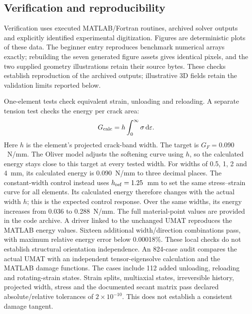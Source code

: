 \documentclass[preprint,11pt,a4paper]{elsarticle}
\begin{document}
\subsection{Verification and reproducibility}

Verification uses executed MATLAB/Fortran
routines, archived solver outputs and explicitly identified experimental
digitization. Figures are deterministic plots of these data. The beginner
entry reproduces benchmark numerical arrays exactly; rebuilding the seven
generated figure assets gives identical pixels, and the two supplied geometry
illustrations retain their source bytes. These checks establish reproduction
of the archived outputs; illustrative 3D fields retain the validation limits
reported below.


One-element tests check equivalent strain, unloading and reloading. A separate tension test checks the energy per crack area:
\begin{equation}
G_{\rm calc}=h\int_0^\infty\sigma\,\mathrm d\varepsilon.
\end{equation}
Here $h$ is the element's projected crack-band width. The target is $G_F=0.090$~N/mm. The Oliver model adjusts the softening curve using $h$, so the calculated energy stays close to this target at every tested width. For widths of 0.5, 1, 2 and 4~mm, its calculated energy is 0.090~N/mm to three decimal places. The constant-width control instead uses $h_{\rm ref}=1.25$~mm to set the same stress--strain curve for all elements. Its calculated energy therefore changes with the actual width $h$; this is the expected control response. Over the same widths, its energy increases from 0.036 to 0.288~N/mm. The full material-point values are provided in the code archive.
A driver linked to the unchanged UMAT reproduces the MATLAB energy values. Sixteen additional width/direction combinations pass, with maximum relative energy error below 0.00018\%. These local checks do not establish structural orientation independence.
An 824-case audit compares the actual UMAT with an independent
tensor-eigensolve calculation and the MATLAB damage functions. The cases include 112 added unloading, reloading and rotating-strain states. Strain splits,
multiaxial states, irreversible history, projected width, stress and the
documented secant matrix pass declared absolute/relative tolerances of
$2\times10^{-10}$. This does not establish a consistent damage tangent.



\end{document}
